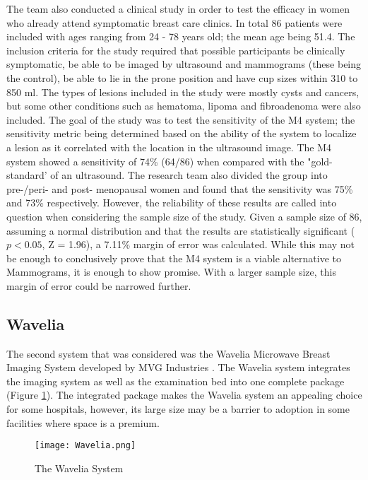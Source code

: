 \noindent The team also conducted a clinical study in order to test the efficacy in women who already attend symptomatic
breast care clinics. In total 86 patients were included with ages ranging from 24 - 78 years old; the mean age being
51.4. The inclusion criteria for the study required that possible participants be clinically symptomatic, be able to be
imaged by ultrasound and mammograms (these being the control), be able to lie in the prone position and have cup sizes
within 310 to 850 ml. The types of lesions included in the study were mostly cysts and cancers, but some other
conditions such as hematoma, lipoma and fibroadenoma were also included. The goal of the study was to test the
sensitivity of the M4 system; the sensitivity metric being determined based on the ability of the system to localize a
lesion as it correlated with the location in the ultrasound image. The M4 system showed a sensitivity of 74\% (64/86)
when compared with the "gold-standard' of an ultrasound. The research team also divided the group into pre-/peri- and
post- menopausal women and found that the sensitivity was 75\% and 73\% respectively. However, the reliability of these
results are called into question when considering the sample size of the study. Given a sample size of 86, assuming
a normal distribution and that the results are statistically significant ($p < 0.05$, Z = 1.96), a 7.11\% margin of
error was calculated. While this may not be enough to conclusively prove that the M4 system is a viable alternative to
Mammograms, it is enough to show promise. With a larger sample size, this margin of error could be narrowed further.

\subsection{Wavelia}
The second system that was considered was the Wavelia Microwave Breast Imaging System developed by MVG Industries
\cite{moloneyWaveliaMicrowaveBreast2021}. The Wavelia system integrates the imaging system as well as the examination
bed into one complete package (Figure \ref{fig:WaveliaSystem}). The integrated package makes the Wavelia system an
appealing choice for some hospitals, however, its large size may be a barrier to adoption in some facilities where space
is a premium. \hfill \break

\begin{figure}
    \texttt{[image: Wavelia.png]}
    \centering
    \caption{The Wavelia System \cite{moloneyWaveliaMicrowaveBreast2021}}
    \label{fig:WaveliaSystem}
\end{figure}

